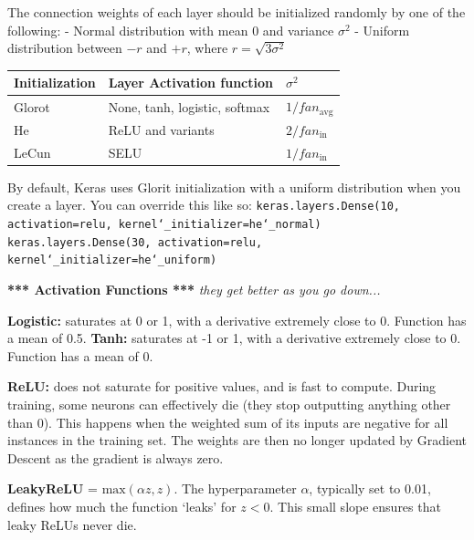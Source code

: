 The connection weights of each layer should be initialized randomly by one of the following:\newline
- Normal distribution with mean 0 and variance $\sigma^2$\newline
- Uniform distribution between $-r$ and $+r$, where $r=\sqrt{3 \sigma^2}$ 

\begin{tabular}{ l|l|l } 

Initialization & Layer Activation function & $\sigma^2$ \\ 
\hline
Glorot & None, tanh, logistic, softmax & $1/fan_{\textrm{avg}}$\\
He & ReLU and variants & $2/fan_{\textrm{in}}$\\
LeCun & SELU & $1/fan_{\textrm{in}}$\\
\end{tabular}

By default, Keras uses Glorit initialization with a uniform distribution when you create a layer.\newline
You can override this like so:\newline
\texttt{keras.layers.Dense(10, activation=\textquotesingle relu\textquotesingle, kernel\char`_initializer=\textquotesingle he\char`_normal\textquotesingle)}
\texttt{keras.layers.Dense(30, activation=\textquotesingle relu\textquotesingle, kernel\char`_initializer=\textquotesingle he\char`_uniform\textquotesingle)}\newline

\textbf{*** Activation Functions ***} \textit{they get better as you go down...}

\textbf{Logistic:} saturates at 0 or 1, with a derivative extremely close to 0. Function has a mean of 0.5.\newline
\textbf{Tanh:} saturates at -1 or 1, with a derivative extremely close to 0. Function has a mean of 0.

\textbf{ReLU:} does not saturate for positive values, and is fast to compute.\newline
During training, some neurons can effectively die (they stop outputting anything other than 0).\newline
This happens when the weighted sum of its inputs are negative for all instances in the training set.
The weights are then no longer updated by Gradient Descent as the gradient is always zero.

\textbf{LeakyReLU} = $\textrm{max}(\alpha z, z)$.
The hyperparameter $\alpha$, typically set to 0.01, defines how much the function `leaks' for $z<0$.
This small slope ensures that leaky ReLUs never die.

